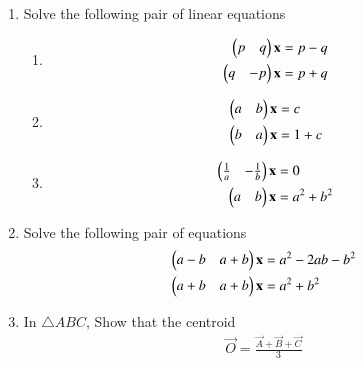 \renewcommand{\theequation}{\theenumi}
\begin{enumerate}[label=\arabic*.,ref=\thesubsection.\theenumi]

\item Solve the following pair of linear equations
%
\begin{enumerate}[itemsep=2pt]
\item
\begin{align}
\begin{split}
\begin{pmatrix}p & q \end{pmatrix}\mathbf{x}&=p-q
\\
\begin{pmatrix}q & -p \end{pmatrix}\mathbf{x}&=p+q
\end{split}
\end{align}
\item
\begin{align}
\begin{split}
\begin{pmatrix}a & b \end{pmatrix}\mathbf{x}&=c
\\
\begin{pmatrix}b & a \end{pmatrix}\mathbf{x}&=1+c
\end{split}
\end{align}
\item
\begin{align}
\begin{split}
\begin{pmatrix}\frac{1}{a} & -\frac{1}{b} \end{pmatrix}\mathbf{x}&=0
\\
\begin{pmatrix}a & b \end{pmatrix}\mathbf{x}&=a^2+b^2
\end{split}
\end{align}
%
\end{enumerate}
\solution 

%
\item Solve the following pair of equations
\begin{align}
\begin{split}
\begin{pmatrix}a-b & a+b \end{pmatrix}\mathbf{x}&=a^2-2ab-b^2
\\
\begin{pmatrix}a+b & a+b \end{pmatrix}\mathbf{x}&=a^2+b^2
\end{split}
\end{align}

\item In $\triangle ABC$, Show that the centroid 
\begin{align}
\vec{O} = \frac{\vec{A}+\vec{B}+\vec{C}}{3}
\end{align}
%
\\
\solution 



\end{enumerate}
